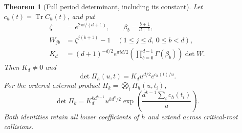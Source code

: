 \documentclass[11pt,a4paper]{article}
\newtheorem{theorem}{Theorem}[section]
\DeclareMathOperator{\Tr}{Tr}
\begin{document}
\begin{theorem}[Full period determinant, including its constant]
Let $c_h(t)=\Tr C_h(t)$, and put
\begin{align}
 \zeta&=e^{2\pi i/(d+1)},\qquad \beta_b=\frac{b+1}{d+1},
       \nonumber\\
 W_{jb}&=\zeta^{j(b+1)}-1
       \quad(1\le j\le d,\ 0\le b<d),\nonumber\\
 K_d&=(d+1)^{-d/2}e^{\pi i d/2}
           \left(\prod_{b=0}^{d-1}\Gamma(\beta_b)\right)\det W.
       \label{BC:eq:constant}
\end{align}
Then $K_d\ne0$ and
\begin{equation}
 \boxed{\det\Pi_h(u,t)=K_d u^{d/2}e^{c_h(t)/u}.}
 \label{BC:eq:det-one}
\end{equation}
For the ordered external product $\Pi_k=\bigotimes_i\Pi_h(u,t_i)$,
\begin{equation}
 \boxed{\det\Pi_k
   =K_d^{k d^{k-1}}u^{k d^k/2}
         \exp\!\left(\frac{d^{k-1}\sum_i c_h(t_i)}u\right).}
 \label{BC:eq:det-all}
\end{equation}
Both identities retain all lower coefficients of $h$ and extend across
critical-root collisions.
\end{theorem}
\end{document}
